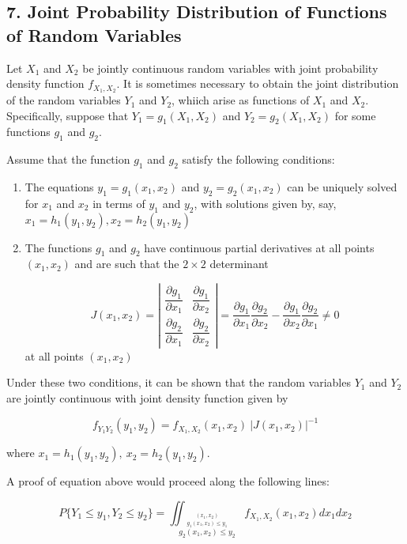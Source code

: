 \newpage

\subsection*{7. Joint Probability Distribution of Functions of Random Variables}

Let $X_1$ and $X_2$ be jointly continuous random variables with joint probability density function $f_{X_1,X_2}$. It is sometimes necessary to obtain the joint distribution of the random variables $Y_1$ and $Y_2$, whiich arise as functions of $X_1$ and $X_2$. Specifically, suppose that $Y_1 = g_1(X_1,X_2)$ and $Y_2 = g_2(X_1,X_2)$ for some functions $g_1$ and $g_2$.

Assume that the function $g_1$ and $g_2$ satisfy the following conditions:

\begin{enumerate}
	\item The equations $y_1 = g_1(x_1,x_2)$ and $y_2 = g_2(x_1,x_2)$ can be uniquely solved for $x_1$ and $x_2$ in terms of $y_1$ and $y_2$, with solutions given by, say, $x_1 = h_1(y_1,y_2),x_2 = h_2(y_1,y_2)$
	\item The functions $g_1$ and $g_2$ have continuous partial derivatives at all points $(x_1,x_2)$ and are such that the $2 \times 2$ determinant
	
	$$J(x_1,x_2) = \left| \begin{matrix}
		\dfrac{\partial g_1}{\partial x_1} & \dfrac{\partial g_1}{\partial x_2} \\
		\dfrac{\partial g_2}{\partial x_1} & \dfrac{\partial g_2}{\partial x_2}
	\end{matrix} \right|  = \dfrac{\partial g_1}{\partial x_1} \dfrac{\partial g_2}{\partial x_2} - \dfrac{\partial g_1}{\partial x_2} \dfrac{\partial g_2}{\partial x_1} \neq 0$$
	at all points $(x_1,x_2)$
\end{enumerate}

Under these two conditions, it can be shown that the random variables $Y_1$ and $Y_2$ are jointly continuous with joint density function given by

$$f_{Y_1Y_2}(y_1,y_2) = f_{X_1,X_2}(x_1,x_2)~|J(x_1,x_2)|^{-1}$$

where $x_1 = h_1(y_1,y_2),~ x_2 = h_2(y_1,y_2)$.

A proof of equation above would proceed along the following lines:

$$P\{Y_1 \leq y_1,Y_2 \leq y_2\} = \iint_{\stackrel{(x_1,x_2)}{\stackrel{g_1(x_1,x_2) \leq y_1}{g_2(x_1,x_2) \leq y_2}}}f_{X_1,X_2}(x_1,x_2)dx_1dx_2$$













